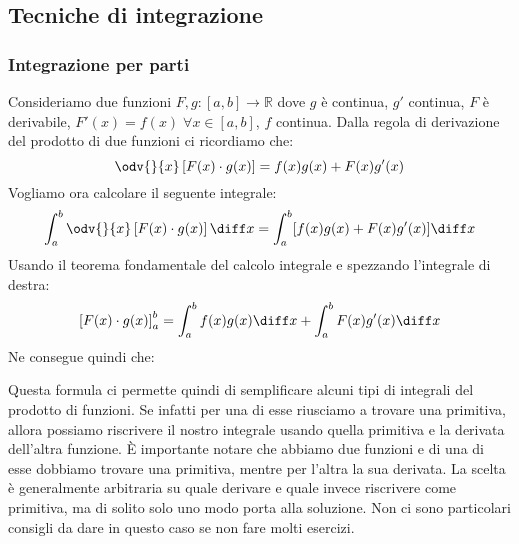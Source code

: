 \subsection{Tecniche di integrazione}
\subsubsection{Integrazione per parti}
Consideriamo due funzioni $F, g:[a,b] \to \mathbb{R}$ dove $g$ è continua, $g'$ 
continua, $F$ è derivabile, $F'(x) = f(x) \;\forall x \in [a,b]$, $f$ continua. 
Dalla regola di derivazione del prodotto di due funzioni ci ricordiamo che:
\begin{equation*}
	\odv{}{x} \left[F(x) \cdot g(x)\right] = f(x)g(x) + F(x)g'(x)
\end{equation*}
Vogliamo ora calcolare il seguente integrale:
\begin{equation*}
	\int_a^b \odv{}{x} \left[F(x) \cdot g(x)\right] \diff x = \int_a^b 
    [f(x)g(x) + F(x)g'(x)] \diff x
\end{equation*}
Usando il teorema fondamentale del calcolo integrale e spezzando l'integrale 
di destra:
\begin{equation*}
	\left[F(x) \cdot g(x)\right]_a^b = \int_a^b f(x)g(x) \diff x + \int_a^b 
    F(x)g'(x) \diff x
\end{equation*}
Ne consegue quindi che:

Questa formula ci permette quindi di semplificare alcuni tipi di integrali del 
prodotto di funzioni. Se infatti per una di esse riusciamo a trovare una 
primitiva, allora possiamo riscrivere il nostro integrale usando quella 
primitiva e la derivata dell'altra funzione. È importante notare che abbiamo 
due funzioni e di una di esse dobbiamo trovare una primitiva, mentre per 
l'altra la sua derivata. La scelta è generalmente arbitraria su quale derivare 
e quale invece riscrivere come primitiva, ma di solito solo uno modo porta 
alla soluzione. Non ci sono particolari consigli da dare in questo caso se 
non fare molti esercizi.\\

